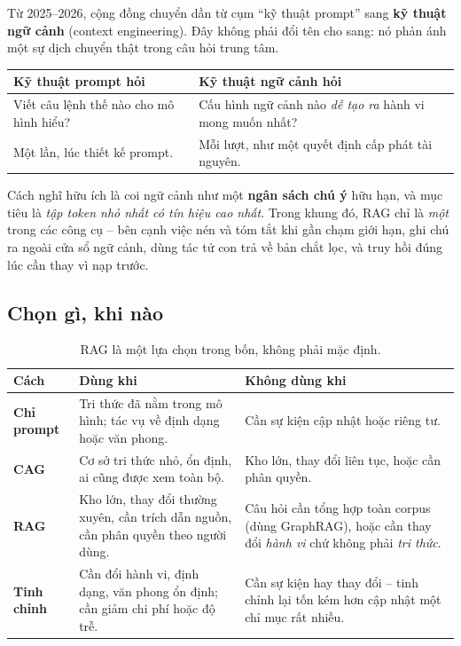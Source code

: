 Từ 2025--2026, cộng đồng chuyển dần từ cụm “kỹ thuật prompt” sang \textbf{kỹ thuật ngữ cảnh} (context engineering). Đây không phải đổi tên cho sang: nó phản ánh một sự dịch chuyển thật trong câu hỏi trung tâm.

\begin{center}
\small
\begin{tabular}{@{}ll@{}}
\toprule
\textbf{Kỹ thuật prompt hỏi} & \textbf{Kỹ thuật ngữ cảnh hỏi} \\
\midrule
Viết câu lệnh thế nào cho mô hình hiểu? & Cấu hình ngữ cảnh nào \emph{dễ tạo ra} hành vi mong muốn nhất? \\
Một lần, lúc thiết kế prompt. & Mỗi lượt, như một quyết định cấp phát tài nguyên. \\
\bottomrule
\end{tabular}
\end{center}

\noindent Cách nghĩ hữu ích là coi ngữ cảnh như một \textbf{ngân sách chú ý} hữu hạn, và mục tiêu là \emph{tập token nhỏ nhất có tín hiệu cao nhất}. Trong khung đó, RAG chỉ là \emph{một} trong các công cụ -- bên cạnh việc nén và tóm tắt khi gần chạm giới hạn, ghi chú ra ngoài cửa sổ ngữ cảnh, dùng tác tử con trả về bản chắt lọc, và truy hồi đúng lúc cần thay vì nạp trước.

\subsection{Chọn gì, khi nào}
\label{ssec:rag_decision}

\begin{table}[H]
\centering
\small
\begin{tabularx}{\textwidth}{@{}lXX@{}}
\toprule
\textbf{Cách} & \textbf{Dùng khi} & \textbf{Không dùng khi} \\
\midrule
\textbf{Chỉ prompt} & Tri thức đã nằm trong mô hình; tác vụ về định dạng hoặc văn phong. & Cần sự kiện cập nhật hoặc riêng tư. \\
\textbf{CAG} & Cơ sở tri thức nhỏ, ổn định, ai cũng được xem toàn bộ. & Kho lớn, thay đổi liên tục, hoặc cần phân quyền. \\
\textbf{RAG} & Kho lớn, thay đổi thường xuyên, cần trích dẫn nguồn, cần phân quyền theo người dùng. & Câu hỏi cần tổng hợp toàn corpus (dùng GraphRAG), hoặc cần thay đổi \emph{hành vi} chứ không phải \emph{tri thức}. \\
\textbf{Tinh chỉnh} & Cần đổi hành vi, định dạng, văn phong ổn định; cần giảm chi phí hoặc độ trễ. & Cần sự kiện hay thay đổi -- tinh chỉnh lại tốn kém hơn cập nhật một chỉ mục rất nhiều. \\
\bottomrule
\end{tabularx}
\caption{RAG là một lựa chọn trong bốn, không phải mặc định.}
\label{tab:rag_decision}
\end{table}

